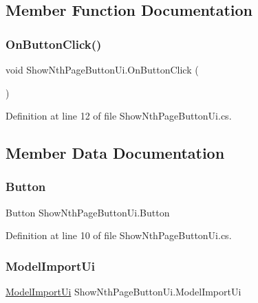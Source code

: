 \subsection{Member Function Documentation}
\mbox{\label{class_show_nth_page_button_ui_aa1688012097d455138dc09cea38f6287}} 
\subsubsection{\texorpdfstring{OnButtonClick()}{OnButtonClick()}}
{\footnotesize\ttfamily void Show\+Nth\+Page\+Button\+Ui.\+On\+Button\+Click (\begin{DoxyParamCaption}{ }\end{DoxyParamCaption})}



Definition at line 12 of file Show\+Nth\+Page\+Button\+Ui.\+cs.



\subsection{Member Data Documentation}
\mbox{\label{class_show_nth_page_button_ui_a08c2eeefe4be66c7634ddd116a32a9a2}} 
\subsubsection{\texorpdfstring{Button}{Button}}
{\footnotesize\ttfamily Button Show\+Nth\+Page\+Button\+Ui.\+Button}



Definition at line 10 of file Show\+Nth\+Page\+Button\+Ui.\+cs.

\mbox{\label{class_show_nth_page_button_ui_adc4338f73874204ed3c86faa877cd2eb}} 
\subsubsection{\texorpdfstring{ModelImportUi}{ModelImportUi}}
{\footnotesize\ttfamily \mbox{\hyperlink{class_model_import_ui}{Model\+Import\+Ui}} Show\+Nth\+Page\+Button\+Ui.\+Model\+Import\+Ui}



